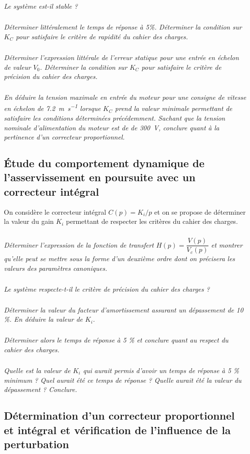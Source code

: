 \documentclass[10pt,fleqn]{article} %
\begin{document}
\subparagraph{}\textit{Le système est-il stable ?}

\subparagraph{}\textit{Déterminer littéralement le temps de réponse à 5\%. Déterminer la condition sur $K_C$ pour satisfaire le critère de rapidité du cahier des charges. }

\subparagraph{}\textit{ Déterminer l’expression littérale de l’erreur statique pour une entrée en échelon de valeur $V_0$. Déterminer la condition sur $K_C$ pour satisfaire le critère de précision du cahier des charges.  }

\subparagraph{}\textit{En déduire la tension maximale en entrée du moteur pour une consigne de vitesse en échelon de \SI{7,2}{m.s^{-1}} lorsque $K_C$ prend la valeur minimale permettant de satisfaire les conditions déterminées précédemment. Sachant que la tension nominale d'alimentation du moteur est de de \SI{300}{V}, conclure quant à la pertinence d’un 
correcteur proportionnel. }

\subsection*{Étude du comportement dynamique de l’asservissement en poursuite avec un correcteur intégral }

On considère le correcteur intégral $C(p)=K_i/p$ et on se propose de déterminer la valeur du gain $K_i$ permettant de respecter les critères du cahier des charges. 


\subparagraph{}\textit{Déterminer l’expression de la fonction de transfert $H(p)=\dfrac{V(p)}{V_c(p)}$ et montrer qu’elle peut se mettre sous la forme d’un deuxième ordre dont on précisera les valeurs des paramètres canoniques.}

\subparagraph{}\textit{Le système respecte-t-il le critère de précision du cahier des charges ? }

\subparagraph{}\textit{Déterminer la valeur du facteur d’amortissement assurant un dépassement de 10 \%. En déduire la valeur de $K_i$. }

\subparagraph{}\textit{Déterminer alors le temps de réponse à 5 \% et conclure quant au respect du cahier des charges. }

\subparagraph{}\textit{Quelle est la valeur de $K_i$ qui aurait permis d’avoir un temps de réponse à 5 \% minimum ? Quel aurait été ce temps de réponse ? Quelle aurait été la valeur du dépassement ? Conclure. }

\subsection*{Détermination d’un correcteur proportionnel et intégral et vérification de l’influence de la perturbation }
\end{document}
